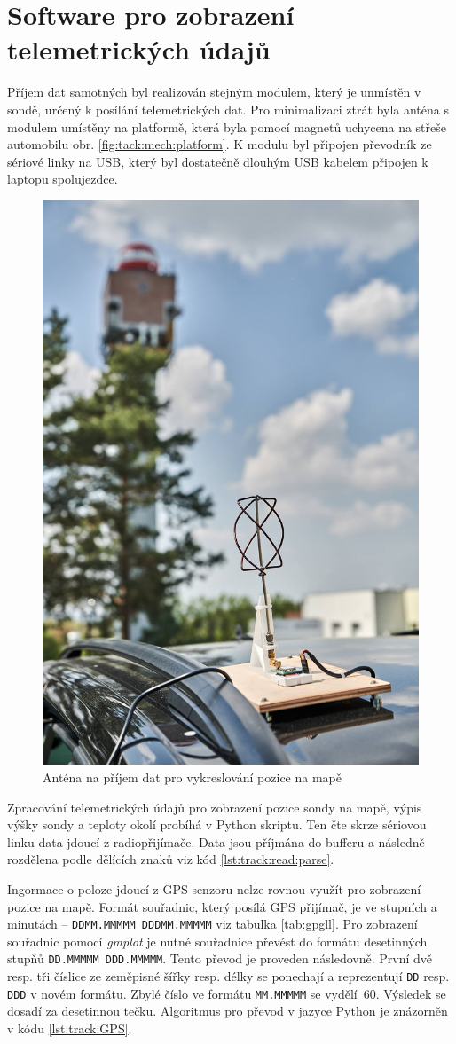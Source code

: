 \documentclass[twoside]{ctuthesis}
\theoremstyle{plain}
\theoremstyle{definition}
\theoremstyle{note}
\begin{document}
	\section{Software pro zobrazení telemetrických údajů}
	Příjem dat samotných byl realizován stejným modulem, který je unmístěn v sondě, určený k posílání telemetrických dat. Pro minimalizaci ztrát byla anténa s modulem umístěny na platformě, která byla pomocí magnetů uchycena na střeše automobilu obr. \ref{fig:tack:mech:platform}. K modulu byl připojen převodník ze sériové linky na USB, který byl dostatečně dlouhým USB kabelem připojen k laptopu spolujezdce.

	\begin{figure}
		\centering
		\includegraphics[width=.6\textwidth]{Figures/antena_auto.jpeg}
		\caption{Anténa na příjem dat pro vykreslování pozice na mapě}
		\label{fig:auto:antena}
	\end{figure}


	Zpracování telemetrických údajů pro zobrazení pozice sondy na mapě, výpis výšky sondy a teploty okolí probíhá v Python skriptu. Ten čte skrze sériovou linku data jdoucí z radiopřijímače. Data jsou příjmána do bufferu a následně rozdělena podle dělících znaků viz kód \ref{lst:track:read:parse}.
	

	Ingormace o poloze jdoucí z GPS senzoru nelze rovnou využít pro zobrazení pozice na mapě. Formát souřadnic, který posílá GPS přijímač, je ve stupních a minutách -- \lstinline|DDMM.MMMMM DDDMM.MMMMM| viz tabulka \ref{tab:gpgll}. Pro zobrazení souřadnic pomocí \textit{gmplot} je nutné souřadnice převést do formátu desetinných stupňů \lstinline|DD.MMMMM DDD.MMMMM|. Tento převod je proveden následovně. První dvě resp. tři číslice ze zeměpisné šířky resp. délky se ponechají a reprezentují \lstinline|DD| resp. \lstinline|DDD| v novém formátu. Zbylé číslo ve formátu \lstinline|MM.MMMMM| se vydělí~60. Výsledek se dosadí za desetinnou tečku. Algoritmus pro převod v jazyce Python je znázorněn v kódu \ref{lst:track:GPS}.
\end{document}
